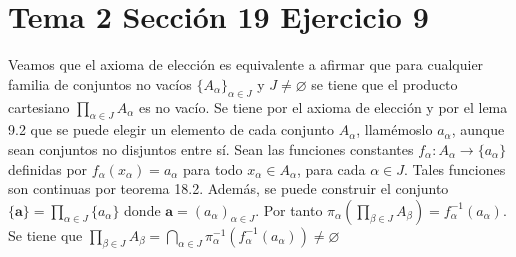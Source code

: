 \documentclass{article}
\newcommand{\vect}[1]{\boldsymbol{#1}}
\begin{document}
\section{Tema 2 Sección 19 Ejercicio 9}
Veamos que el axioma de elección es equivalente a afirmar que para cualquier familia de conjuntos no vacíos $\{A_\alpha\}_{\alpha\in J}$ y $J\neq \varnothing$ se tiene que el producto cartesiano $\prod_{\alpha\in J}A_\alpha$ es no vacío. Se tiene por el axioma de elección y por el lema 9.2 que se puede elegir un elemento de cada conjunto $A_\alpha$, llamémoslo $a_\alpha$, aunque sean conjuntos no disjuntos entre sí. Sean las funciones constantes $f_\alpha:A_\alpha\rightarrow \{a_\alpha\}$ definidas por $f_\alpha(x_\alpha)=a_\alpha$ para todo $x_\alpha\in A_\alpha$, para cada $\alpha\in J$. Tales funciones son continuas por teorema 18.2. Además, se puede construir el conjunto $\{\vect{a}\}=\prod_{\alpha\in J}\{a_\alpha\}$ donde $\vect{a}= (a_\alpha)_{\alpha\in J}$. Por tanto $\pi_\alpha(\prod_{\beta\in J}A_\beta)=f^{-1}_\alpha(a_\alpha)$. Se tiene que $\prod_{\beta\in J}A_\beta=\bigcap_{\alpha\in J}\pi^{-1}_\alpha(f^{-1}_\alpha(a_\alpha))\neq \varnothing$
\end{document}
